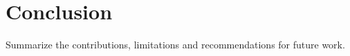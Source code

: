 \chapter{Conclusion}\label{chap:conclusion}
Summarize the contributions, limitations and recommendations for future work.
